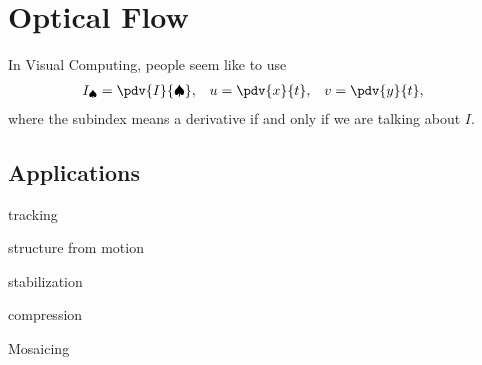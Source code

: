 \setcounter{chapter}{7}
\chapter{Optical Flow}
In Visual Computing, people seem like to use
\begin{align*}
	I_{\spadesuit}&=\pdv{I}{\spadesuit},&u&=\pdv{x}{t},&v&=\pdv{y}{t},
\end{align*}
where the subindex means a derivative if and only if we are talking about $I$.
\section{Applications}
\begin{enumerate*}[label=\protect\circled{\arabic*}]
	\item tracking
	\item structure from motion
	\item stabilization
	\item compression
	\item Mosaicing
\end{enumerate*}
